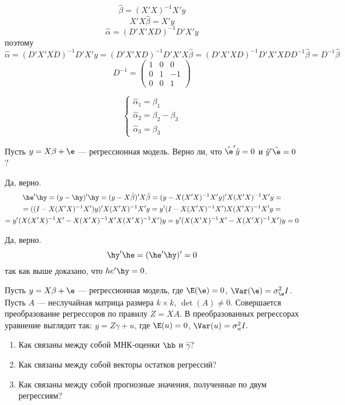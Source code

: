 \documentclass[pdftex,11pt,openany]{book}\usepackage[]{graphicx}\usepackage[]{color}
\begin{document}
\begin{solution}
\[\hat\beta=(X'X)^{-1}X'y\]
\[X'X\hat\beta=X'y\]
\[\hat\alpha=(D'X'XD)^{-1}D'X'y\]
поэтому
\[\hat\alpha=(D'X'XD)^{-1}D'X'y=(D'X'XD)^{-1}D'X'X\hat\beta=(D'X'XD)^{-1}D'X'XDD^{-1}\hat\beta=D^{-1}\hat\beta\]
\[D^{-1}=\left(\begin{array}{ccc}
1 & 0 & 0\\ 
0 & 1 & -1\\
0 & 0 & 1
\end{array}\right)\]

\[\begin{cases}
\hat\alpha_1=\beta_1\\
\hat\alpha_2=\beta_2-\beta_3\\
\hat\alpha_3=\beta_3
\end{cases}\]
\end{solution}


\begin{problem}
Пусть $y = X\beta + \e$ --- регрессионная модель. Верно ли, что $\hat{\e}'\hat{y}=0$ и $\hat{y}'\hat{\e}=0$?
\end{problem}
\begin{solution}
Да, верно.
\begin{multline*}
\he'\hy=(y-\hy)'\hy=(y-X\hat\beta)'X\hat\beta=(y-X(X'X)^{-1}X'y)'X(X'X)^{-1}X'y=\\=
((I-X(X'X)^{-1}X')y)'X(X'X)^{-1}X'y=y'(I-X(X'X)^{-1}X')X(X'X)^{-1}X'y=\\
=y'(X(X'X)^{-1}X'-X(X'X)^{-1}X'X(X'X)^{-1}X')y=y'(X(X'X)^{-1}X'-X(X'X)^{-1}X')y=0
\end{multline*}

Да, верно.
\[\hy'\he=(\he'\hy)'=0\]
так как выше доказано, что $he'\hy=0$.
\end{solution}

\begin{problem}
Пусть $y = X\beta + \e$ --- регрессионная модель, где $\E(\e)=0$, $\Var(\e)=\sigma_{\e}^2 I$. Пусть $A$ --- неслучайная матрица размера $k \times k$, $\det(A) \not= 0.$ Совершается преобразование регрессоров по правилу $Z=XA$. В преобразованных регрессорах уравнение выглядит так: $y = Z\gamma + u$, где $\E(u)=0$, $\Var(u)=\sigma_{u}^2 I.$

\begin{enumerate}
\item Как связаны между собой МНК-оценки $\hb$ и $\hat{\gamma}$?
\item Как связаны между собой векторы остатков регрессий?
\item Как связаны между собой прогнозные значения, полученные по двум регрессиям?
\end{enumerate}
\end{problem}
\end{document}
